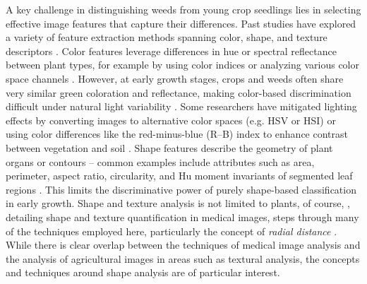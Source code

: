 \documentclass[letterpaper]{report}
\begin{document}
A key challenge in distinguishing weeds from young crop seedlings lies in selecting effective image features that capture their differences. Past studies have explored a variety of feature extraction methods spanning color, shape, and texture descriptors \parencite{Garibaldi-Marquez2022-yn}. Color features leverage differences in hue or spectral reflectance between plant types, for example by using color indices or analyzing various color space channels \parencite{Wu2021-gt}. However, at early growth stages, crops and weeds often share very similar green coloration and reflectance, making color-based discrimination difficult under natural light variability \parencite{Garibaldi-Marquez2022-yn}. Some researchers have mitigated lighting effects by converting images to alternative color spaces (e.g. HSV or HSI) or using color differences like the red-minus-blue (R–B) index to enhance contrast between vegetation and soil \parencite{Wu2021-gt}. Shape features describe the geometry of plant organs or contours – common examples include attributes such as area, perimeter, aspect ratio, circularity, and Hu moment invariants of segmented leaf regions \parencite{Garibaldi-Marquez2022-yn}. This limits the discriminative power of purely shape-based classification in early growth. Shape and texture analysis is not limited to plants, of course, \citeauthor{Bankman2009-wq}, detailing shape and texture quantification in medical images, steps through many of the techniques employed here, particularly the concept of \textit{radial distance} \parencite{Bankman2009-wq}. While there is clear overlap between the techniques of medical image analysis and the analysis of agricultural images in areas such as textural analysis, the concepts and techniques around shape analysis are of particular interest.
\end{document}
